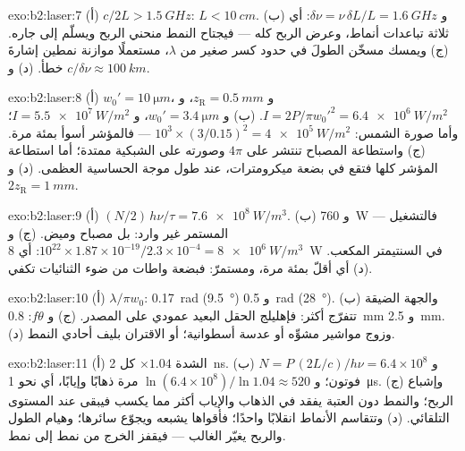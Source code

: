 \begin{solution}{exo:b2:laser:7}
(أ) $c/2L > \qty{1.5}{GHz}$: $L < \qty{10}{cm}$. (ب) و $\delta\nu = \nu\,\delta L/L
= \qty{1.6}{GHz}$: أي ثلاثة تباعدات أنماط، وعرض الربح كله --- فيجتاح النمط
منحني الربح ويسلّم إلى جاره. (ج) ويمسك
مسخّن الطولَ في حدود كسر صغير من $\lambda$، مستعملًا
موازنة نمطين إشارةَ خطأ. (د) و $c/\delta\nu \approx
\qty{100}{km}$.
\end{solution}

\begin{solution}{exo:b2:laser:8}
(أ) $w_0' = \qty{10}{\micro m}$، و $z_{\text{R}} = \qty{0.5}{mm}$، و $I = 2P/\pi
w_0'^2 = \qty{6.4e6}{W/m^2}$. (ب) و $w_0' = \qty{3.4}{\micro m}$، و $I =
\qty{5.5e7}{W/m^2}$؛ وأما صورة الشمس: $10^3 \times (3/0.15)^2 =
\qty{4e5}{W/m^2}$ --- فالمؤشر أسوأ بمئة مرة. (ج) واستطاعة المصباح
تنتشر على $4\pi$ وصورته على الشبكية ممتدة؛ أما
استطاعة المؤشر كلها فتقع في بضعة ميكرومترات، عند طول موجة
الحساسية العظمى. (د) و $2z_{\text{R}} = \qty{1}{mm}$.
\end{solution}

\begin{solution}{exo:b2:laser:9}
(أ) $(N/2)\,h\nu/\tau = \qty{7.6e8}{W/m^3}$. (ب) و \qty{760}{W} --- فالتشغيل المستمر
غير وارد: بل مصباح وميض. (ج) و $10^{22} \times 1.87 \times
10^{-19}/2.3 \times 10^{-4} = \qty{8e6}{W/m^3}$: أي \qty{8}{W} في السنتيمتر
المكعب. (د) أي أقلّ بمئة مرة، ومستمرّ: فبضعة واطات من
ضوء الثنائيات تكفي.
\end{solution}

\begin{solution}{exo:b2:laser:10}
(أ) $\lambda/\pi w_0$: \qty{0.17}{rad} (\qty{9.5}{\degree}) و \qty{0.5}{rad}
(\qty{28}{\degree}). (ب) والجهة الضيقة تتفرّج أكثر:
فإهليلج الحقل البعيد عمودي على المصدر. (ج) و $f\theta$:
\qty{0.8}{mm} و \qty{2.5}{mm}. (د) وزوج مواشير مشوِّه أو
عدسة أسطوانية؛ أو الاقتران بليف أحادي النمط.
\end{solution}

\begin{solution}{exo:b2:laser:11}
(أ) الشدة $\times 1.04$ كل \qty{2}{ns}. (ب) و $N = P\,(2L/c)/h\nu =
6.4 \times 10^8$ فوتون؛ و $\ln(6.4 \times 10^8)/\ln 1.04 \approx 520$ مرة ذهابًا
وإيابًا، أي نحو \qty{1}{\micro s}. (ج) وإشباع الربح؛ والنمط دون
العتبة يفقد في الذهاب والإياب أكثر مما يكسب فيبقى عند
المستوى التلقائي. (د) وتتقاسم الأنماط انقلابًا واحدًا؛ فأقواها
يشبعه ويجوّع سائرها؛ وهيام الطول والربح يغيّر
الغالب --- فيقفز الخرج من نمط إلى نمط.
\end{solution}


